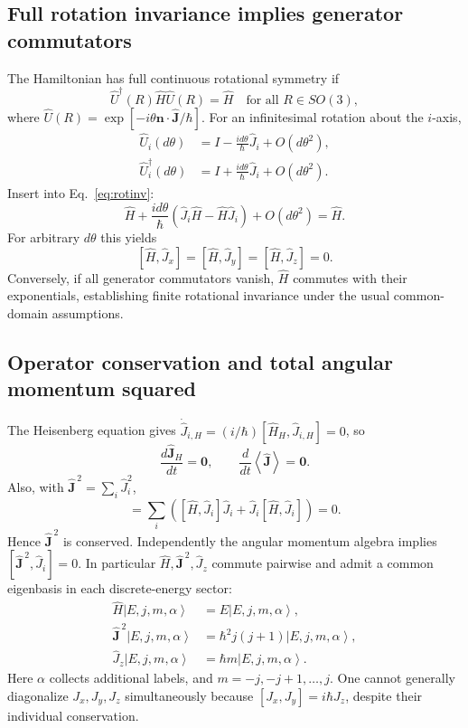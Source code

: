 \documentclass[11pt,a4paper]{article}
\theoremstyle{definition}
\newcommand{\ket}[1]{\left|#1\right\rangle}
\newcommand{\avg}[1]{\left\langle #1\right\rangle}
\newcommand{\UU}{\hat U}
\begin{document}
\subsection{Full rotation invariance implies generator commutators}
The Hamiltonian has full continuous rotational symmetry if
\begin{equation}
\boxed{\UU^\dagger(R)\hat H\UU(R)=\hat H\quad\text{for all }R\in SO(3),}
\label{eq:rotinv}
\end{equation}
where \(\UU(R)=\exp[-i\theta\mathbf n\cdot\hat{\mathbf J}/\hbar]\). For an infinitesimal rotation about the \(i\)-axis,
\begin{align}
\UU_i(d\theta)&=I-\frac{id\theta}{\hbar}\hat J_i+O(d\theta^2),\\
\UU_i^\dagger(d\theta)&=I+\frac{id\theta}{\hbar}\hat J_i+O(d\theta^2).
\end{align}
Insert into Eq.~\eqref{eq:rotinv}:
\begin{equation}
\hat H+\frac{id\theta}{\hbar}(\hat J_i\hat H-\hat H\hat J_i)+O(d\theta^2)=\hat H.
\end{equation}
For arbitrary \(d\theta\) this yields
\begin{equation}
\boxed{[\hat H,\hat J_x]=[\hat H,\hat J_y]=[\hat H,\hat J_z]=0.}
\label{eq:rotcomm}
\end{equation}
Conversely, if all generator commutators vanish, \(\hat H\) commutes with their exponentials, establishing finite rotational invariance under the usual common-domain assumptions.
\subsection{Operator conservation and total angular momentum squared}
The Heisenberg equation gives \(\dot{\hat J}_{i,H}=(i/\hbar)[\hat H_H,\hat J_{i,H}]=0\), so
\begin{equation}
\boxed{\frac{d\hat{\mathbf J}_H}{dt}=\mathbf0,\qquad
\frac{d}{dt}\avg{\hat{\mathbf J}}=\mathbf0.}
\end{equation}
Also, with \(\hat{\mathbf J}^{\,2}=\sum_i\hat J_i^2\),
\begin{equation}
[\hat H,\hat{\mathbf J}^{\,2}]
=\sum_i([\hat H,\hat J_i]\hat J_i+\hat J_i[\hat H,\hat J_i])=0.
\end{equation}
Hence \(\hat{\mathbf J}^{\,2}\) is conserved. Independently the angular momentum algebra implies \([\hat{\mathbf J}^{\,2},\hat J_i]=0\). In particular \(\hat H,\hat{\mathbf J}^{\,2},\hat J_z\) commute pairwise and admit a common eigenbasis in each discrete-energy sector:
\begin{align}
\hat H\ket{E,j,m,\alpha}&=E\ket{E,j,m,\alpha},\\
\hat{\mathbf J}^{\,2}\ket{E,j,m,\alpha}&=\hbar^2j(j+1)\ket{E,j,m,\alpha},\\
\hat J_z\ket{E,j,m,\alpha}&=\hbar m\ket{E,j,m,\alpha}.
\label{eq:jstate}
\end{align}
Here \(\alpha\) collects additional labels, and \(m=-j,-j+1,\ldots,j\). One cannot generally diagonalize \(J_x,J_y,J_z\) simultaneously because \([J_x,J_y]=i\hbar J_z\), despite their individual conservation.
\end{document}
